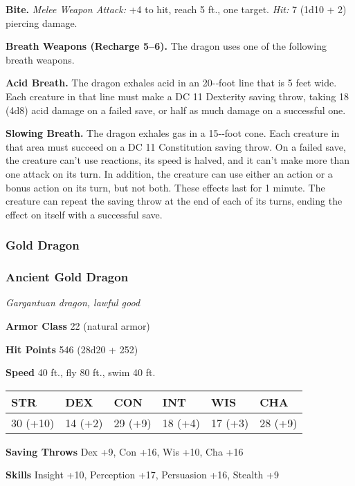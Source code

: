 \documentclass[
]{article}
\begin{document}
\textbf{Bite.} \emph{Melee Weapon Attack:} +4 to hit, reach 5 ft., one
target. \emph{Hit:} 7 (1d10 + 2) piercing damage.

\textbf{Breath Weapons (Recharge 5--6).} The dragon uses one of the
following breath weapons.

\textbf{Acid Breath.} The dragon exhales acid in an 20-­‐foot line that
is 5 feet wide. Each creature in that line must make a DC 11 Dexterity
saving throw, taking 18 (4d8) acid damage on a failed save, or half as
much damage on a successful one.

\textbf{Slowing Breath.} The dragon exhales gas in a 15-­‐foot cone.
Each creature in that area must succeed on a DC 11 Constitution saving
throw. On a failed save, the creature can't use reactions, its speed is
halved, and it can't make more than one attack on its turn. In addition,
the creature can use either an action or a bonus action on its turn, but
not both. These effects last for 1 minute. The creature can repeat the
saving throw at the end of each of its turns, ending the effect on
itself with a successful save.

\hypertarget{gold-dragon}{%
\subsubsection{Gold Dragon}\label{gold-dragon}}

\hypertarget{ancient-gold-dragon}{%
\subsubsection{Ancient Gold Dragon}\label{ancient-gold-dragon}}

\emph{Gargantuan dragon, lawful good}

\textbf{Armor Class} 22 (natural armor)

\textbf{Hit Points} 546 (28d20 + 252)

\textbf{Speed} 40 ft., fly 80 ft., swim 40 ft.

\begin{longtable}[]{@{}llllll@{}}
\toprule
STR & DEX & CON & INT & WIS & CHA\tabularnewline
\midrule
\endhead
30 (+10) & 14 (+2) & 29 (+9) & 18 (+4) & 17 (+3) & 28
(+9)\tabularnewline
\bottomrule
\end{longtable}

\textbf{Saving Throws} Dex +9, Con +16, Wis +10, Cha +16

\textbf{Skills} Insight +10, Perception +17, Persuasion +16, Stealth +9
\end{document}
